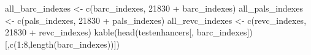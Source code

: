 \documentclass[
  letterpaper,
  DIV=11,
  numbers=noendperiod]{scrartcl}
\newenvironment{Shaded}{\begin{snugshade}}{\end{snugshade}}
\newcommand{\DecValTok}[1]{\textcolor[rgb]{0.68,0.00,0.00}{#1}}
\newcommand{\FunctionTok}[1]{\textcolor[rgb]{0.28,0.35,0.67}{#1}}
\newcommand{\NormalTok}[1]{\textcolor[rgb]{0.00,0.23,0.31}{#1}}
\newcommand{\OtherTok}[1]{\textcolor[rgb]{0.00,0.23,0.31}{#1}}
\newcommand{\SpecialCharTok}[1]{\textcolor[rgb]{0.37,0.37,0.37}{#1}}
\begin{document}
\begin{Shaded}
\begin{Highlighting}[]
\NormalTok{all\_barc\_indexes }\OtherTok{\textless{}{-}} \FunctionTok{c}\NormalTok{(barc\_indexes, }\DecValTok{21830} \SpecialCharTok{+}\NormalTok{ barc\_indexes)}
\NormalTok{all\_pals\_indexes }\OtherTok{\textless{}{-}} \FunctionTok{c}\NormalTok{(pals\_indexes, }\DecValTok{21830} \SpecialCharTok{+}\NormalTok{ pals\_indexes)}
\NormalTok{all\_revc\_indexes }\OtherTok{\textless{}{-}} \FunctionTok{c}\NormalTok{(revc\_indexes, }\DecValTok{21830} \SpecialCharTok{+}\NormalTok{ revc\_indexes)}
\FunctionTok{kable}\NormalTok{(}\FunctionTok{head}\NormalTok{(testenhancers[, barc\_indexes])[,}\FunctionTok{c}\NormalTok{(}\DecValTok{1}\SpecialCharTok{:}\DecValTok{8}\NormalTok{,}\FunctionTok{length}\NormalTok{(barc\_indexes))])}
\end{Highlighting}
\end{Shaded}
\end{document}
